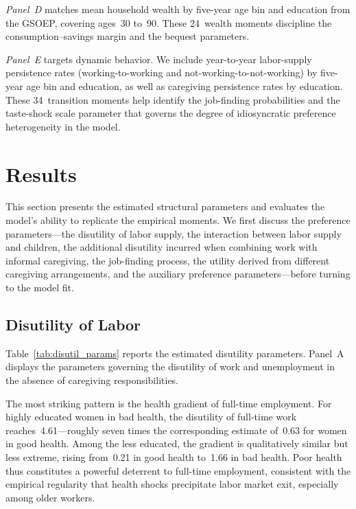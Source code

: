\textit{Panel~D} matches mean household wealth by five-year age bin and
education from the GSOEP, covering ages~30 to~90.  These 24~wealth moments
discipline the consumption--savings margin and the bequest parameters.

\textit{Panel~E} targets dynamic behavior.  We include year-to-year
labor-supply persistence rates (working-to-working and
not-working-to-not-working) by five-year age bin and education, as well as
caregiving persistence rates by education.  These 34~transition moments help
identify the job-finding probabilities and the taste-shock scale parameter
that governs the degree of idiosyncratic preference heterogeneity in the
model.




\section{Results}
\label{sec:results}

This section presents the estimated structural parameters and evaluates the
model's ability to replicate the empirical moments.  We first discuss the
preference parameters---the disutility of labor supply, the interaction
between labor supply and children, the additional disutility incurred when
combining work with informal caregiving, the job-finding process, the
utility derived from different caregiving arrangements, and the auxiliary
preference parameters---before turning to the model fit.


\subsection{Disutility of Labor}
\label{sec:results_disutil}

Table~\ref{tab:disutil_params} reports the estimated disutility parameters.
Panel~A displays the parameters governing the disutility of work and
unemployment in the absence of caregiving responsibilities.

The most striking pattern is the health gradient of full-time employment.
For highly educated women in bad health, the disutility of full-time work
reaches~4.61---roughly seven times the corresponding estimate of~0.63 for
women in good health.  Among the less educated, the gradient is
qualitatively similar but less extreme, rising from~0.21 in good health
to~1.66 in bad health.  Poor health thus constitutes a powerful deterrent
to full-time employment, consistent with the empirical regularity that
health shocks precipitate labor market exit, especially among older workers.

